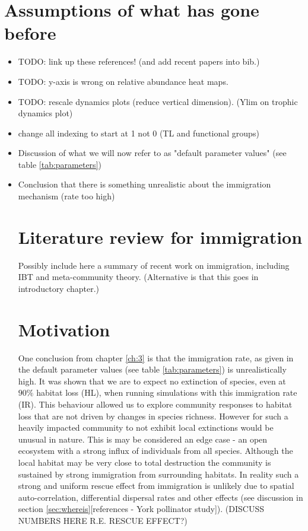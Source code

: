 \section{Assumptions of what has gone before}

\begin{itemize}

	\item TODO: link up these references! (and add recent papers into bib.)
	\item TODO: y-axis is wrong on relative abundance heat maps.	
	\item TODO: rescale dynamics plots (reduce vertical dimension). (Ylim on trophic dynamics plot)
	\item change all indexing to start at 1 not 0 (TL and functional groups)
	\item Discussion of what we will now refer to as "default parameter values" (see table \ref{tab:parameters})
	\item Conclusion that there is something unrealistic about the immigration mechanism (rate too high)
	
\cite{ripple2012trophic}

\section{Literature review for immigration}

Possibly include here a summary of recent work on immigration, including IBT and meta-community theory. (Alternative is that this goes in introductory chapter.) 

\section{Motivation}
\label{sec:motivate_immigration}

One conclusion from chapter \ref{ch:3} is that the immigration rate, as given in the default parameter values (see table \ref{tab:parameters}) is unrealistically high. It was shown that we are to expect no extinction of species, even at $90\%$ habitat loss (HL), when running simulations with this immigration rate (IR). This behaviour allowed us to explore community responses to habitat loss that are not driven by changes in species richness. However for such a heavily impacted community to not exhibit local extinctions would be unusual in nature. This is may be considered an edge case - an open ecosystem with a strong influx of individuals from all species. Although the local habitat may be very close to total destruction the community is sustained by strong immigration from surrounding habitats. In reality such a strong and uniform rescue effect from immigration is unlikely due to spatial auto-correlation, differential dispersal rates and other effects (see discussion in section \ref{sec:whereis}[references - York pollinator study]).  (DISCUSS NUMBERS HERE R.E. RESCUE EFFECT?)
  

\end{itemize}
